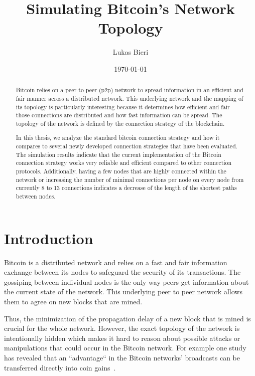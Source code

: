 \documentclass[a4paper, oneside]{discothesis}
\title{Simulating Bitcoin's Network Topology}
\author{Lukas Bieri}
\institute{Distributed Computing Group \\[2pt]
Computer Engineering and Networks Laboratory \\[2pt]
ETH Zürich}
\date{\today}
\begin{document}
\frontmatter %
\maketitle

\cleardoublepage

\begin{abstract}
    Bitcoin relies on a peer-to-peer (p2p) network to spread information in an efficient and fair manner across a distributed network. This underlying network and the mapping of its topology is particularly interesting because it determines how efficient and fair those connections are distributed and how fast information can be spread.
    The topology of the network is defined by the connection strategy of the blockchain.
    
    In this thesis, we analyze the standard bitcoin connection strategy and how it compares to several newly developed connection strategies that have been evaluated. The simulation results indicate that the current implementation of the Bitcoin connection strategy works very reliable and efficient compared to other connection protocols. Additionally, having a few nodes that are highly connected within the network or increasing the number of minimal connections per node on every node from currently 8 to 13 connections indicates a decrease of the length of the shortest paths between nodes.
\end{abstract}

\tableofcontents

\mainmatter %

\chapter{Introduction}

Bitcoin is a distributed network and relies on a fast and fair information exchange between its nodes to safeguard the security of its transactions. The gossiping between individual nodes is the only way peers get information about the current state of the network. This underlying peer to peer network allows them to agree on new blocks that are mined.

Thus, the minimization of the propagation delay of a new block that is mined is crucial for the whole network. However, the exact topology of the network is intentionally hidden which makes it hard to reason about possible attacks or manipulations that could occur in the Bitcoin network. For example one study has revealed that an ``advantage`` in the Bitcoin networks' broadcasts can be transferred directly into coin gains~\cite{MajorityIsNotEnough}.
\end{document}
